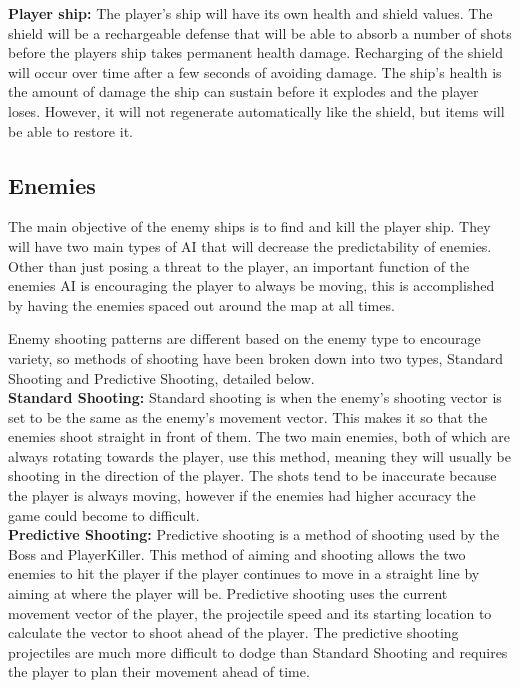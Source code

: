\documentclass[12pt]{article}       %
\def\hs{\hspace{15pt}}
\begin{document}
	{\bf Player ship:} The player's ship will have its own health and shield values. The shield will be a rechargeable defense that will be able to absorb a number of shots before the players ship takes permanent health damage. Recharging of the shield will occur over time after a few seconds of avoiding damage. The ship's health is the amount of damage the ship can sustain before it explodes and the player loses. However, it will not regenerate automatically like the shield, but items will be able to restore it. 

\subsection{Enemies} %

\hs The main objective of the enemy ships is to find and kill the player ship. They will have two main types of AI that will decrease the predictability of enemies. Other than just posing a threat to the player, an important function of the enemies AI is encouraging the player to always be moving, this is accomplished by having the enemies spaced out around the map at all times. 

\hs Enemy shooting patterns are different based on the enemy type to encourage variety, so methods of shooting have been broken down into two types, Standard Shooting and Predictive Shooting, detailed below.\\

	{\bf Standard Shooting:} Standard shooting is when the enemy’s shooting vector is set to be the same as the enemy’s movement vector. This makes it so that the enemies shoot straight in front of them. The two main enemies, both of which are always rotating towards the player, use this method, meaning they will usually be shooting in the direction of the player.  The shots tend to be inaccurate because the player is always moving, however if the enemies had higher accuracy the game could become to difficult. \\

	{\bf Predictive Shooting:} Predictive shooting is a method of shooting used by the Boss and PlayerKiller. This method of aiming and shooting allows the two enemies to hit the player if the player continues to move in a straight line by aiming at where the player will be. Predictive shooting uses the current movement vector of the player, the projectile speed and its starting location to calculate the vector to shoot ahead of the player. The predictive shooting projectiles are much more difficult to dodge than Standard Shooting and requires the player to plan their movement ahead of time. \\
\end{document}
